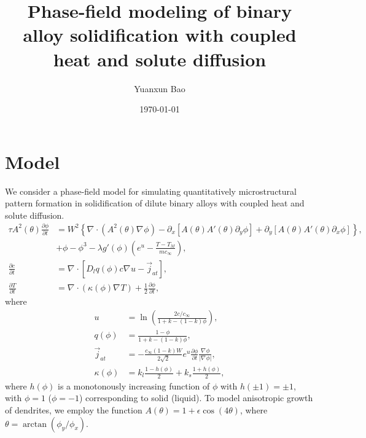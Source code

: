 \documentclass[a4paper,12pt]{article}
\title{Phase-field modeling of binary alloy solidification with coupled heat and solute diffusion}
\author{Yuanxun Bao}
\date{\today}
\renewcommand{\div}[1]{\nabla_{#1} \cdot}
\newcommand{\grad}[1]{\nabla_{#1}}
\begin{document}
\maketitle

\section{Model}

We consider a phase-field model for simulating quantitatively microstructural pattern formation in solidification of dilute binary alloys with coupled heat and solute diffusion. 
\begin{align}
\tau A^2(\theta) \frac{\partial \phi}{\partial t}  & =   W^2  \left\{ \div{} (A^2(\theta) \grad{} \phi) - \partial_x [ A(\theta) A'(\theta) \partial_y \phi ] + \partial_y [A(\theta) A'(\theta) \partial_x \phi ] \right\}, \\
 &  + \phi - \phi^3  - \lambda g'(\phi) \left( e^{u} - \frac{T-T_M}{m c_{\infty}} \right),  \nonumber \\
 \frac{\partial c}{\partial t }  & = \div{} [ D_l q(\phi) c \grad{} u - \vec{j}_{at} ], \\
 \frac{\partial T}{\partial t} &= \div{} (\kappa(\phi) \grad{} T) + \frac{1}{2} \frac{\partial \phi}{\partial t},
\end{align}
where 
\begin{align}
 u &= \ln \left(  \frac{2c/c_{\infty}}{1+k-(1-k) \phi } \right), \\
 q(\phi) &= \frac{1-\phi}{1+k - (1-k)\phi}, \\ 
 \vec{j}_{at} &= -\frac{c_{\infty}(1-k)W}{2\sqrt{2}} e^{u} \frac{\partial \phi}{ \partial t} \frac{\grad{} \phi}{|\grad{} \phi|}, \\
 \kappa(\phi) & = k_l  \frac{1-h(\phi)}{2} + k_s \frac{1+h(\phi)}{2},
\end{align}
where $h(\phi)$ is a monotonously increasing function of $\phi$ with $h(\pm 1) = \pm 1$, with $\phi = 1$ ($\phi = -1$) corresponding to solid (liquid). To model anisotropic growth of dendrites, we employ the function $A(\theta) = 1 + \epsilon \cos ( 4 \theta )$, where $\theta = \arctan(\phi_y / \phi_x)$.
\end{document}
